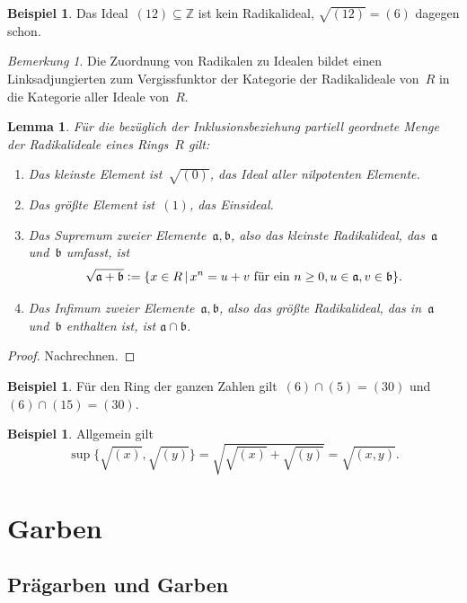 \documentclass[a4paper,ngerman,12pt]{scrartcl}
\theoremstyle{definition}
\newtheorem{bsp}[defn]{Beispiel}
\theoremstyle{plain}
\newtheorem{lemma}[defn]{Lemma}
\theoremstyle{remark}
\newtheorem{bem}[defn]{Bemerkung}
\newcommand{\ZZ}{\mathbb{Z}}
\renewcommand{\aa}{\mathfrak{a}}
\newcommand{\bb}{\mathfrak{b}}
\renewcommand{\_}{\mathpunct{.}\,}
\newcommand{\?}{\,{:}\,}
\newcommand{\defeq}{\vcentcolon=}
\begin{document}
\begin{bsp}Das Ideal~$(12) \subseteq \ZZ$ ist kein Radikalideal, $\sqrt{(12)} =
(6)$ dagegen schon.\end{bsp}

\begin{bem}Die Zuordnung von Radikalen zu Idealen bildet einen
Linksadjungierten zum Vergissfunktor der Kategorie der Radikalideale von~$R$ in
die Kategorie aller Ideale von~$R$.\end{bem}

\begin{lemma}\label{lemma:rad}%
Für die bezüglich der Inklusionsbeziehung partiell geordnete Menge
der Radikalideale eines Rings~$R$ gilt:
\begin{enumerate}
\item Das kleinste Element ist~$\sqrt{(0)}$, das Ideal aller nilpotenten
Elemente.
\item Das größte Element ist~$(1)$, das Einsideal.
\item Das Supremum zweier Elemente~$\aa,\bb$, also das kleinste Radikalideal,
das~$\aa$ und~$\bb$ umfasst, ist
\[ \sqrt{\aa + \bb} \defeq \{ x \in R \,|\, \text{$x^n = u + v$ für ein~$n \geq 0,
u \in \aa, v \in \bb$} \}. \]
\item Das Infimum zweier Elemente~$\aa,\bb$, also das größte Radikalideal,
das in~$\aa$ und~$\bb$ enthalten ist, ist $\aa \cap \bb$.
\end{enumerate}
\end{lemma}
\begin{proof}Nachrechnen.\end{proof}

\begin{bsp}Für den Ring der ganzen Zahlen gilt~$(6) \cap (5) = (30)$ und~$(6)
\cap (15) = (30)$.\end{bsp}

\begin{bsp}Allgemein gilt
\[ \sup\bigl\{ \sqrt{(x)}, \sqrt{(y)} \bigr\} = \sqrt{\sqrt{(x)} + \sqrt{(y)}} =
\sqrt{(x,y)}. \]
\end{bsp}


\section{Garben}

\label{appendix:garben}

\subsection{Prägarben und Garben}
\end{document}
